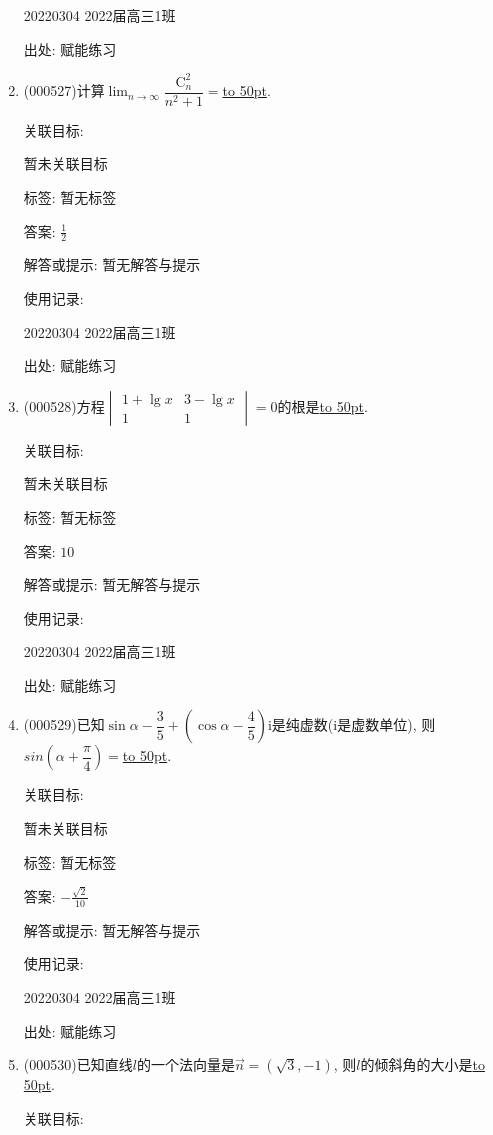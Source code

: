 \documentclass[10pt,a4paper]{article}
\newcommand{\blank}[1]{\underline{\hbox to #1pt{}}}
\begin{document}
\begin{enumerate}[1.]
20220304	2022届高三1班	


出处: 赋能练习
\item { (000527)}计算$\displaystyle\lim_{n\to\infty}\dfrac{\mathrm{C}_n^2}{n^2+1}=$\blank{50}.


关联目标:

暂未关联目标



标签: 暂无标签

答案: $\frac 12$

解答或提示: 暂无解答与提示

使用记录:

20220304	2022届高三1班	


出处: 赋能练习
\item { (000528)}方程$\begin{vmatrix} 1+\lg x & 3-\lg x  \\   1 & 1  \end{vmatrix}=0$的根是\blank{50}.


关联目标:

暂未关联目标



标签: 暂无标签

答案: $10$

解答或提示: 暂无解答与提示

使用记录:

20220304	2022届高三1班	


出处: 赋能练习
\item { (000529)}已知$\sin \alpha -\dfrac35+(\cos \alpha -\dfrac45)\mathrm{i}$是纯虚数($\mathrm{i}$是虚数单位), 则$sin(\alpha +\dfrac{\pi}4)=$\blank{50}.


关联目标:

暂未关联目标



标签: 暂无标签

答案: $-\frac{\sqrt 2}{10}$

解答或提示: 暂无解答与提示

使用记录:

20220304	2022届高三1班	


出处: 赋能练习
\item { (000530)}已知直线$l$的一个法向量是$\overrightarrow{n}=(\sqrt3,-1)$, 则$l$的倾斜角的大小是\blank{50}.


关联目标:


\end{enumerate}
\end{document}
